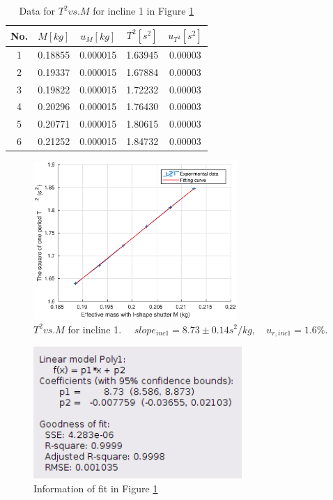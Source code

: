     \begin{table}
        \centering
        \begin{tabular}{|c|c|c|c|c|}
            \hline
            No. & $M[kg]$ & $u_{M}[kg]$ & $T^2[s^2]$ & $u_{T^2}[s^2]$\\ \hline
            1 & 0.18855 & 0.000015 & 1.63945 & 0.00003\\ \hline
            2 & 0.19337 & 0.000015 & 1.67884 & 0.00003\\ \hline
            3 & 0.19822 & 0.000015 & 1.72232 & 0.00003\\ \hline
            4 & 0.20296 & 0.000015 & 1.76430 & 0.00003\\ \hline
            5 & 0.20771 & 0.000015 & 1.80615 & 0.00003\\ \hline
            6 & 0.21252 & 0.000015 & 1.84732 & 0.00003\\ \hline
        \end{tabular}
        \caption{Data for $T^2 vs. M$ for incline 1 in Figure \ref{tmi1}}\label{tmi1data}
    \end{table}
    \begin{figure}[!h]
        \centering
        \includegraphics[height=6cm]{images/tmi1.eps}
        \caption{$T^2 vs. M$ for incline 1. $\quad slope_{inc1}=8.73\pm 0.14s^2/kg,\quad u_{r,inc1}=1.6\%.$}\label{tmi1}
    \end{figure}
    \begin{figure}[!h]
        \centering
        \includegraphics[height=5cm]{images/tmi1info.png}
        \caption{Information of fit in Figure \ref{tmi1}}\label{tmi1info}
    \end{figure}
